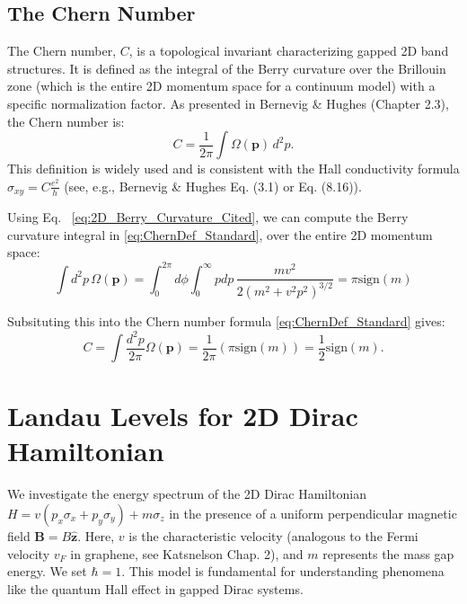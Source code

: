 \documentclass[11pt]{article}
\newcommand{\sgn}{\mathrm{sign}}
\begin{document}
\subsection{The Chern Number}


The Chern number, $C$, is a topological invariant characterizing gapped 2D band structures. It is defined as the integral of the Berry curvature over the Brillouin zone (which is the entire 2D momentum space for a continuum model) with a specific normalization factor. As presented in Bernevig \& Hughes \cite{bernevig2013topological} (Chapter 2.3), the Chern number is:
\begin{equation}
C = \frac{1}{2\pi} \int \Omega(\mathbf{p}) \, d^2p.
\label{eq:ChernDef_Standard}
\end{equation}
This definition is widely used and is consistent with the Hall conductivity formula $\sigma_{xy} = C \frac{e^2}{h}$ (see, e.g., Bernevig \& Hughes \cite{bernevig2013topological} Eq. (3.1) or Eq. (8.16)). 


Using Eq. ~\eqref{eq:2D_Berry_Curvature_Cited}, we can compute the Berry curvature integral in \eqref{eq:ChernDef_Standard}, over the entire 2D momentum space:
\[ \int d^2p \, \Omega(\mathbf{p}) = \int_0^{2\pi} d\phi \int_0^\infty p dp \, \frac{m v^2}{2 (m^2 + v^2 p^2)^{3/2}} = \pi \sgn(m) \]

Subsituting this into the Chern number formula \eqref{eq:ChernDef_Standard} gives:
\begin{equation}
C = \int \frac{d^2 p}{2\pi} \Omega(\mathbf{p}) = \frac{1}{2\pi} \left( \pi \sgn(m) \right) = \boxed{ \frac{1}{2} \sgn(m)}.
\label{eq:2D_Integral_Value_Final}
\end{equation}




\section{Landau Levels for 2D Dirac Hamiltonian}

We investigate the energy spectrum of the 2D Dirac Hamiltonian $H = v(p_x \sigma_x + p_y \sigma_y) + m \sigma_z$ in the presence of a uniform perpendicular magnetic field $\mathbf{B} = B \hat{\mathbf{z}}$. Here, $v$ is the characteristic velocity (analogous to the Fermi velocity $v_F$ in graphene, see Katsnelson \cite{Katsnelson2012Graphene} Chap. 2), and $m$ represents the mass gap energy. We set $\hbar=1$. This model is fundamental for understanding phenomena like the quantum Hall effect in gapped Dirac systems.
\end{document}
